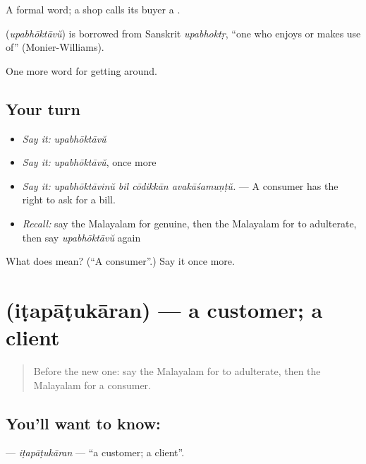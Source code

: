 A formal word; a shop calls its buyer a .

\begin{cousinweb}
\textbf{} (\emph{upabhōktāvŭ}) is borrowed from Sanskrit \emph{upabhoktṛ}, \textquotedblleft{}one who enjoys or makes use of\textquotedblright{} (Monier-Williams).
\end{cousinweb}

\begin{grammarlens}[title={What you've built}]
One more word for getting around.
\end{grammarlens}

\subsection*{Your turn}
\begin{itemize}
\raggedright
  \item \emph{Say it:} \emph{upabhōktāvŭ}
  \item \emph{Say it:} \emph{upabhōktāvŭ}, once more
  \item \emph{Say it:} \emph{upabhōktāvinŭ bil cōdikkān avakāśamuṇṭŭ.} — A consumer has the right to ask for a bill.
  \item \emph{Recall:} say the Malayalam for genuine, then the Malayalam for to adulterate, then say \emph{upabhōktāvŭ} again
\end{itemize}

\begin{tcolorbox}[breakable,colback=teal!4,colframe=teal!35!black,title={Before you move on}]
What does  mean? (\textquotedblleft{}A consumer\textquotedblright{}.) Say it once more.
\end{tcolorbox}
\section[\texorpdfstring{\ml{ഇടപാടുകാരൻ} (iṭapāṭukāran)}{ഇടപാടുകാരൻ (iṭapāṭukāran)}]{ (iṭapāṭukāran) — a customer; a client}

\label{lesson:ML-C493-itapatukaran}



\begin{quote}
Before the new one: say the Malayalam for to adulterate, then the Malayalam for a consumer.
\end{quote}

\subsection*{You'll want to know: }
\textbf{} — \emph{iṭapāṭukāran} — \textquotedblleft{}a customer; a client\textquotedblright{}.

